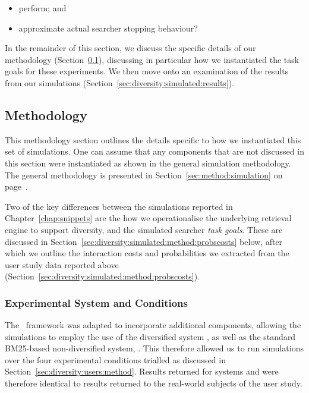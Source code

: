 \begin{itemize}
    \item{ perform; and}
    \item{ approximate actual searcher stopping behaviour?}
\end{itemize}

In the remainder of this section, we discuss the specific details of our methodology (Section~\ref{sec:diversity:simulated:method}), discussing in particular how we instantiated the task goals for these experiments. We then move onto an examination of the results from our simulations (Section~\ref{sec:diversity:simulated:results}).

\subsection{Methodology}\label{sec:diversity:simulated:method}
This methodology section outlines the details specific to how we instantiated this set of simulations. One can assume that any components that are not discussed in this section were instantiated as shown in the general simulation methodology. The general methodology is presented in Section~\ref{sec:method:simulation} on page~\pageref{sec:method:simulation}.

Two of the key differences between the simulations reported in Chapter~\ref{chap:snippets} are the how we operationalise the underlying retrieval engine to support diversity, and the simulated searcher \emph{task goals}. These are discussed in Section~\ref{sec:diversity:simulated:method:probscosts} below, after which we outline the interaction costs and probabilities we extracted from the user study data reported above (Section~\ref{sec:diversity:simulated:method:probscosts}).

\subsubsection{Experimental System and Conditions}\label{sec:diversity:simulated:method:system}
The \simiir~framework was adapted to incorporate additional components, allowing the simulations to employ the use of the diversified system , as well as the standard BM25-based non-diversified system, . This therefore allowed us to run simulations over the four experimental conditions trialled as discussed in Section~\ref{sec:diversity:users:method}. Results returned for systems  and  were therefore identical to results returned to the real-world subjects of the user study.

